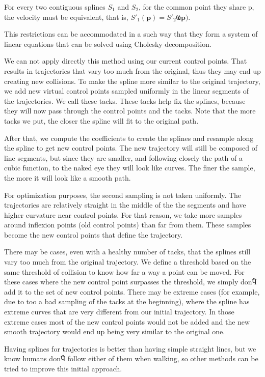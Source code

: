 For every two contiguous splines $S_1$ and $S_2$, for the common point they share p, the velocity must be equivalent, that is,  $S'_1(\mathbf{p})=S'_2Ҩ\mathbf{p})$.
  
This restrictions can be accommodated in a such way that they form a system of linear equations that can be solved using Cholesky decomposition.

We can not apply directly this method using our current control points. That results in trajectories that vary too much from the original, thus they may end up creating new collisions. To make the spline more similar to the original trajectory, we add new virtual control points sampled uniformly in the linear segments of the trajectories. We call these tacks. These tacks help fix the splines, because they will now pass through the control points and the tacks. Note that the more tacks we put, the closer the spline will fit to the original path.

After that, we compute the coefficients to create the splines and resample along the spline to get new control points. The new trajectory will still be composed of line segments, but since they are smaller, and following closely the path of a cubic function, to the naked eye they will look like curves. The finer the sample, the more it will look like a smooth path.

For optimization purposes, the second sampling is not taken uniformly. The trajectories are relatively straight in the middle of the the segments and have higher curvature near control points. For that reason, we take more samples around inflexion points (old control points) than far from them. These samples become the new control points that define the trajectory.

There may be cases, even with a healthy number of tacks, that the splines still vary too much from the original trajectory. We define a threshold based on the same threshold of collision to know how far a way a point can be moved. For these cases where the new control point surpasses the threshold, we simply donӴ add it to the set of new control points.  There may be extreme cases (for example, due to too a bad sampling of the tacks at the beginning), where the spline has extreme curves that are very different from our initial trajectory. In those extreme cases most of the new control points would not be added and the new smooth trajectory would end up being very similar to the original one.

Having splines for trajectories is better than having simple straight lines, but we know humans donӴ  follow either of them when walking,  so other methods can be tried to improve this initial approach.


